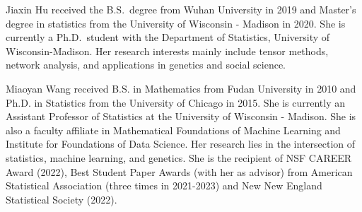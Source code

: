 \documentclass[journal]{IEEEtran}
\theoremstyle{definition}
\theoremstyle{definition}
\begin{document}

\begin{IEEEbiographynophoto}{Jiaxin Hu} received the B.S.\ degree from Wuhan University in 2019 and Master's degree in statistics from the University of Wisconsin - Madison in 2020. She is currently a Ph.D.\ student with the Department of Statistics, University of Wisconsin-Madison. Her research interests mainly include tensor methods, network analysis, and applications in genetics and social science.
\end{IEEEbiographynophoto}


\begin{IEEEbiographynophoto}{Miaoyan Wang} received B.S. in Mathematics from Fudan University in 2010 and Ph.D. in Statistics from the University of Chicago in 2015. She is currently an Assistant Professor of Statistics at the University of Wisconsin - Madison. She is also a faculty affiliate in Mathematical Foundations of Machine Learning and Institute for Foundations of Data Science.
Her research lies in the intersection of statistics, machine learning, and genetics. She is the recipient of NSF CAREER Award (2022), Best Student Paper Awards (with her as advisor) from American Statistical Association (three times in 2021-2023) and New New England Statistical Society (2022). 
\end{IEEEbiographynophoto}






\end{document}
